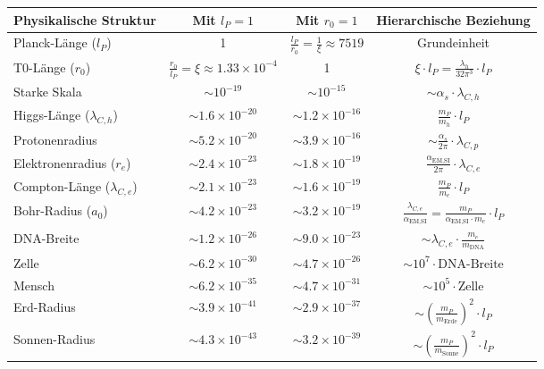 \documentclass[12pt,a4paper]{article}
\newcommand{\alphaEMSI}{\alpha_{\text{EM,SI}}}
\begin{document}
	\begin{table}[H]
		\centering
		\begin{adjustbox}{width=\textwidth}
			\begin{tabular}{lccc}
				\toprule
				\textbf{Physikalische Struktur} & \textbf{Mit \(l_P = 1\)} & \textbf{Mit \(r_0 = 1\)} & \textbf{Hierarchische Beziehung} \\
				\midrule
				Planck-Länge (\(l_P\)) & 1 & \(\frac{l_P}{r_0} = \frac{1}{\xi} \approx 7519\) & Grundeinheit \\
				T0-Länge (\(r_0\)) & \(\frac{r_0}{l_P} = \xi \approx 1.33 \times 10^{-4}\) & 1 & \(\xi \cdot l_P = \frac{\lambda_h}{32\pi^3} \cdot l_P\) \\
				Starke Skala & \(\sim 10^{-19}\) & \(\sim 10^{-15}\) & \(\sim \alpha_s \cdot \lambda_{C,h}\) \\
				Higgs-Länge (\(\lambda_{C,h}\)) & \(\sim 1.6 \times 10^{-20}\) & \(\sim 1.2 \times 10^{-16}\) & \(\frac{m_P}{m_h} \cdot l_P\) \\
				Protonenradius & \(\sim 5.2 \times 10^{-20}\) & \(\sim 3.9 \times 10^{-16}\) & \(\sim \frac{\alpha_s}{2\pi} \cdot \lambda_{C,p}\) \\
				Elektronenradius (\(r_e\)) & \(\sim 2.4 \times 10^{-23}\) & \(\sim 1.8 \times 10^{-19}\) & \(\frac{\alphaEMSI}{2\pi} \cdot \lambda_{C,e}\) \\
				Compton-Länge (\(\lambda_{C,e}\)) & \(\sim 2.1 \times 10^{-23}\) & \(\sim 1.6 \times 10^{-19}\) & \(\frac{m_P}{m_e} \cdot l_P\) \\
				Bohr-Radius (\(a_0\)) & \(\sim 4.2 \times 10^{-23}\) & \(\sim 3.2 \times 10^{-19}\) & \(\frac{\lambda_{C,e}}{\alphaEMSI} = \frac{m_P}{\alphaEMSI \cdot m_e} \cdot l_P\) \\
				DNA-Breite & \(\sim 1.2 \times 10^{-26}\) & \(\sim 9.0 \times 10^{-23}\) & \(\sim \lambda_{C,e} \cdot \frac{m_e}{m_{\mathrm{DNA}}}\) \\
				Zelle & \(\sim 6.2 \times 10^{-30}\) & \(\sim 4.7 \times 10^{-26}\) & \(\sim 10^7 \cdot \text{DNA-Breite}\) \\
				Mensch & \(\sim 6.2 \times 10^{-35}\) & \(\sim 4.7 \times 10^{-31}\) & \(\sim 10^5 \cdot \text{Zelle}\) \\
				Erd-Radius & \(\sim 3.9 \times 10^{-41}\) & \(\sim 2.9 \times 10^{-37}\) & \(\sim \left(\frac{m_P}{m_{\mathrm{Erde}}}\right)^2 \cdot l_P\) \\
				Sonnen-Radius & \(\sim 4.3 \times 10^{-43}\) & \(\sim 3.2 \times 10^{-39}\) & \(\sim \left(\frac{m_P}{m_{\mathrm{Sonne}}}\right)^2 \cdot l_P\) \\

\end{tabular}
\end{adjustbox}
\end{table}
\end{document}
